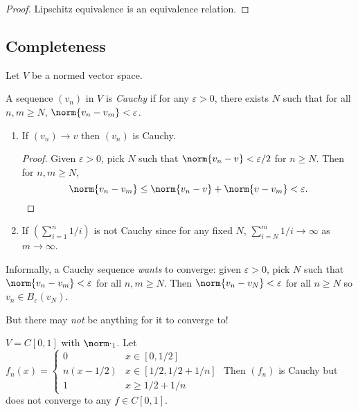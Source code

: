 \documentclass[a4paper]{article}
\theoremstyle{definition}
\begin{document}
\begin{proof}
  Lipschitz equivalence is an equivalence relation.
\end{proof}

\subsection{Completeness}

Let \(V\) be a normed vector space.

\begin{definition}
  A sequence \((v_n)\) in \(V\) is \emph{Cauchy} if for any \(\varepsilon>0\), there exists \(N\) such that for all \(n,m\geq N\), \(\norm{v_n-v_m} < \varepsilon\).
\end{definition}

\begin{eg}\leavevmode
  \begin{enumerate}
  \item If \((v_n)\to v\) then \((v_n)\) is Cauchy.
    \begin{proof}
      Given \(\varepsilon>0\), pick \(N\) such that \(\norm{v_n-v} < \varepsilon/2\) for \(n\geq N\). Then for \(n,m \geq N\),
      \[
        \norm{v_n-v_m} \leq \norm{v_n-v}+ \norm{v-v_m} < \varepsilon.
      \]
    \end{proof}
  \item If \((\sum_{i=1}^{n}1/i )\) is not Cauchy since for any fixed \(N\), \(\sum_{i=N}^{m}1/i \to \infty \) as \(m\to \infty\).
  \end{enumerate}
\end{eg}

Informally, a Cauchy sequence \emph{wants} to converge: given \(\varepsilon>0\), pick \(N\) such that \(\norm{v_n-v_m}< \varepsilon\) for all \(n,m\geq N\). Then \(\norm{v_n-v_N} < \varepsilon\) for all \(n\geq N\) so \(v_n \in B_\varepsilon(v_N)\).

But there may \emph{not} be anything for it to converge to!

\begin{eg}
  \(V = C[0,1]\) with \(\norm \cdot_1\). Let \(f_n(x) =
  \begin{cases}
    0 & x\in[0,1/2] \\
    n(x-1/2) & x\in[1/2,1/2+1/n] \\
    1 & x\geq 1/2+1/n
  \end{cases}
  \) Then \((f_n)\) is Cauchy but does not converge to any \(f\in C[0,1]\).
\end{eg}
\end{document}
